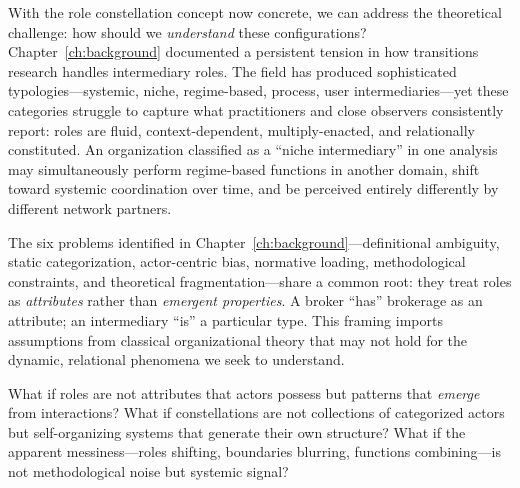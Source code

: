 \documentclass[../main.tex]{subfiles}
\begin{document}
With the role constellation concept now concrete, we can address the theoretical challenge: how should we \emph{understand} these configurations? Chapter~\ref{ch:background} documented a persistent tension in how transitions research handles intermediary roles. The field has produced sophisticated typologies---systemic, niche, regime-based, process, user intermediaries---yet these categories struggle to capture what practitioners and close observers consistently report: roles are fluid, context-dependent, multiply-enacted, and relationally constituted. An organization classified as a ``niche intermediary'' in one analysis may simultaneously perform regime-based functions in another domain, shift toward systemic coordination over time, and be perceived entirely differently by different network partners.

The six problems identified in Chapter~\ref{ch:background}---definitional ambiguity, static categorization, actor-centric bias, normative loading, methodological constraints, and theoretical fragmentation---share a common root: they treat roles as \emph{attributes} rather than \emph{emergent properties}. A broker ``has'' brokerage as an attribute; an intermediary ``is'' a particular type. This framing imports assumptions from classical organizational theory that may not hold for the dynamic, relational phenomena we seek to understand.

What if roles are not attributes that actors possess but patterns that \emph{emerge} from interactions? What if constellations are not collections of categorized actors but self-organizing systems that generate their own structure? What if the apparent messiness---roles shifting, boundaries blurring, functions combining---is not methodological noise but systemic signal?
\end{document}
